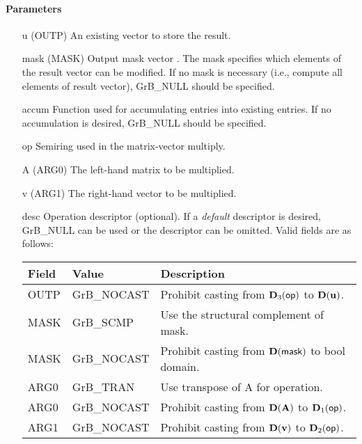 \paragraph{Parameters}

\begin{itemize}[leftmargin=1.1in]
    \item[{\sf u}]    ({\sf OUTP}) An existing vector to store the result.
    
    \item[{\sf mask}] ({\sf MASK}) Output mask vector . The mask
    specifies which elements of the result vector can be modified.
    If no mask is necessary (i.e., compute all elements of result
    vector), {\sf GrB\_NULL} should be specified.

	\item[{\sf accum}]  Function used for accumulating entries into existing
                         entries. If no accumulation is desired,
	                    {\sf GrB\_NULL} should be specified.

    \item[{\sf op}]   Semiring used in the matrix-vector multiply.
    \item[{\sf A}]    ({\sf ARG0}) The left-hand matrix to be multiplied.
    \item[{\sf v}]    ({\sf ARG1}) The right-hand vector to be multiplied.

    \item[{\sf desc}]  Operation descriptor (optional). If a
    \emph{default} descriptor is desired, {\sf GrB\_NULL} can be
    used or the descriptor can be omitted. Valid fields are as follows: \\
    \begin{tabular}{lll}
    Field  & Value & Description \\
    \hline
    {\sf OUTP} & {\sf GrB\_NOCAST} & Prohibit casting from $\bold{D}_3({\sf op})$ to $\bold{D}({\bf u})$.\\
    {\sf MASK} & {\sf GrB\_SCMP}   & Use the structural complement of {\sf mask}. \\
    {\sf MASK} & {\sf GrB\_NOCAST} & Prohibit casting from $\bold{D}({\sf mask})$ to {\sf bool} domain. \\
    {\sf ARG0} & {\sf GrB\_TRAN} & Use transpose of {\sf A} for operation. \\
    {\sf ARG0} & {\sf GrB\_NOCAST} & Prohibit casting from $\bold{D}({\bf A})$ to $\bold{D}_1({\sf op})$. \\
    {\sf ARG1} & {\sf GrB\_NOCAST} & Prohibit casting from $\bold{D}({\bf v})$ to $\bold{D}_2({\sf op})$. \\
    \end{tabular}
\end{itemize}

